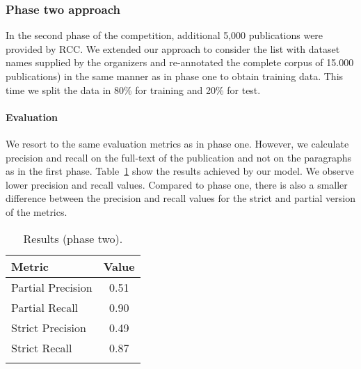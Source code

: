 \subsubsection{Phase two approach}
In the second phase of the competition, additional 5,000 publications were provided by RCC. We extended our approach to consider the list with dataset names supplied by the organizers and re-annotated the complete corpus of 15.000 publications) in the same manner as in phase one to obtain training data. This time we split the data in 80\% for training and 20\% for test. 

\paragraph{Evaluation}
We resort to the same evaluation metrics as in phase one. However, we calculate precision and recall on the full-text of the publication and not on the paragraphs as in the first phase. Table~\ref{table:dataset-mention-eval-phase-two} show the results achieved by our model. We observe lower precision and recall values. Compared to phase one, there is also a smaller difference between the precision and recall values for the strict and partial version of the metrics. 
\begin{table}[hb]
    \center 
    \caption{Results (phase two).} 
    \begin{tabular}{lc} 
        \toprule
        Metric  & Value \\
        \midrule
        Partial Precision   & 0.51 \\
        Partial Recall      & 0.90 \\
        \midrule
        Strict Precision    & 0.49 \\
        Strict Recall       & 0.87 \\ 
        \bottomrule \\ 
    \end{tabular} 
    \label{table:dataset-mention-eval-phase-two} 
\end{table}

